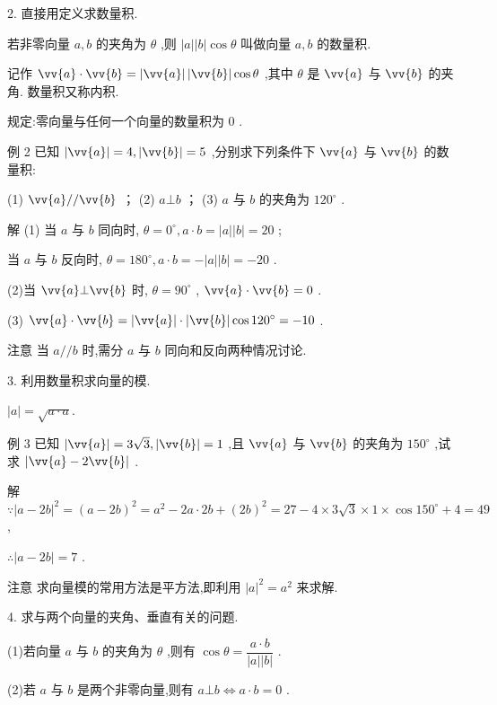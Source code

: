 2. 直接用定义求数量积.

若非零向量 $a,b$ 的夹角为 $\theta$ ,则 $\left| a\right| \left| b\right| \cos \theta$ 叫做向量 $a,b$ 的数量积.

记作 $\vv{a} \cdot  \vv{b} = \left| \vv{a}\right| \left| \vv{b}\right| \cos \theta$ ,其中 $\theta$ 是 $\vv{a}$ 与 $\vv{b}$ 的夹角. 数量积又称内积.

规定:零向量与任何一个向量的数量积为 0 .

例 2 已知 $\left| \vv{a}\right|  = 4,\left| \vv{b}\right|  = 5$ ,分别求下列条件下 $\vv{a}$ 与 $\vv{b}$ 的数量积:

(1) $\vv{a}//\vv{b}$ ； (2) $a\bot b$ ； (3) $a$ 与 $b$ 的夹角为 ${120}^{ \circ  }$ .

解 (1) 当 $a$ 与 $b$ 同向时, $\theta  = {0}^{ \circ  },a \cdot  b = \left| a\right| \left| b\right|  = {20}$ ;

当 $a$ 与 $b$ 反向时, $\theta  = {180}^{ \circ  },a \cdot  b =  - \left| a\right| \left| b\right|  =  - {20}$ .

(2)当 $\vv{a}\bot \vv{b}$ 时, $\theta  = {90}^{ \circ  }$ , $\vv{a} \cdot  \vv{b} = 0$ .

(3) $\vv{a} \cdot  \vv{b} = \left| \vv{a}\right|  \cdot  \left| \vv{b}\right| \cos {120}^{ \circ  } =  - {10}$ .

注意 当 $a//b$ 时,需分 $a$ 与 $b$ 同向和反向两种情况讨论.

3. 利用数量积求向量的模.

$\left| a\right|  = \sqrt{a \cdot  a}.$

例 3 已知 $\left| \vv{a}\right|  = 3\sqrt{3},\left| \vv{b}\right|  = 1$ ,且 $\vv{a}$ 与 $\vv{b}$ 的夹角为 ${150}^{ \circ  }$ ,试求 $\left| {\vv{a} - 2\vv{b}}\right|$ .

解 $\because {\left| a - 2b\right| }^{2} = {\left( a - 2b\right) }^{2} = {a}^{2} - {2a} \cdot  {2b} + {\left( 2b\right) }^{2} = {27} - 4 \times  3\sqrt{3} \times  1 \times  \cos {150}^{ \circ  } + 4 = {49}$ ,

$\therefore \left| {a - {2b}}\right|  = 7$ .

注意 求向量模的常用方法是平方法,即利用 ${\left| a\right| }^{2} = {a}^{2}$ 来求解.

4. 求与两个向量的夹角、垂直有关的问题.

(1)若向量 $a$ 与 $b$ 的夹角为 $\theta$ ,则有 $\cos \theta  = \dfrac{a \cdot  b}{\left| a\right| \left| b\right| }$ .

(2)若 $a$ 与 $b$ 是两个非零向量,则有 $a\bot b \Leftrightarrow  a \cdot  b = 0$ .

